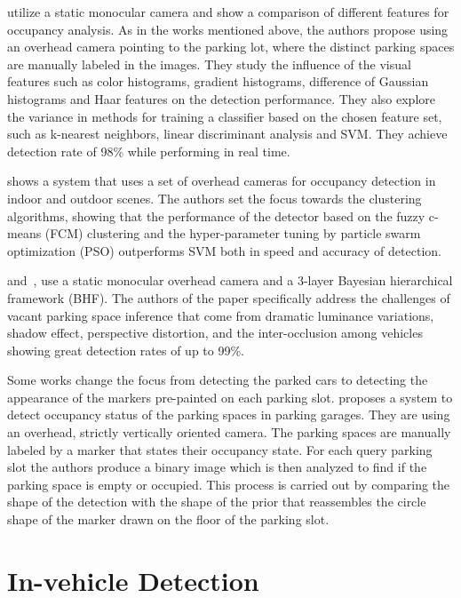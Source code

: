 \citet{tschentscher} utilize a static monocular camera and show a comparison
of different features for occupancy analysis. As in the works mentioned above,
the authors propose using an overhead camera pointing to the parking lot,
where the distinct parking spaces are manually labeled in the images. They
study the influence of the visual features such as color histograms, gradient
histograms, difference of Gaussian histograms and Haar features on the
detection performance. They also explore the variance in methods for training
a classifier based on the chosen feature set, such as k-nearest neighbors,
linear discriminant analysis and SVM\@. They achieve detection rate of 98\%
while performing in real time.

\citet{ichihashi} shows a system that uses a set of overhead cameras for
occupancy detection in indoor and outdoor scenes. The authors set the focus
towards the clustering algorithms, showing that the performance of the
detector based on the fuzzy c-means (FCM) clustering and the hyper-parameter
tuning by particle swarm optimization (PSO) outperforms SVM both in speed and
accuracy of detection.

\citet{chingchun10} and~\citet{chingjao10}, use a static monocular overhead
camera and a 3-layer Bayesian hierarchical framework (BHF). The authors of the
paper specifically address the challenges of vacant parking space inference
that come from dramatic luminance variations, shadow effect, perspective
distortion, and the inter-occlusion among vehicles showing great detection
rates of up to 99\%.

Some works change the focus from detecting the parked cars to detecting the
appearance of the markers pre-painted on each parking slot. \citet{yusnita12}
proposes a system to detect occupancy status of the parking spaces in parking
garages. They are using an overhead, strictly vertically oriented camera. The
parking spaces are manually labeled by a marker that states their occupancy
state. For each query parking slot the authors produce a binary image which is
then analyzed to find if the parking space is empty or occupied. This process
is carried out by comparing the shape of the detection with the shape of the
prior that reassembles the circle shape of the marker drawn on the floor of
the parking slot.
\newline
\newline


\section*{In-vehicle Detection} %
\label{sec:in_vehicle_detection}

